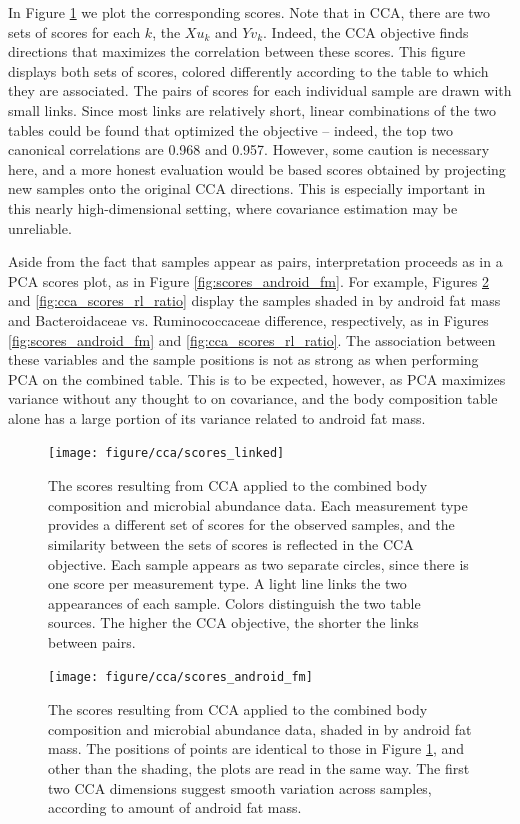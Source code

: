 \documentclass{article}
\begin{document}
In Figure \ref{fig:cca_scores_linked} we plot the corresponding scores. Note
that in CCA, there are two sets of scores for each $k$, the $Xu_{k}$ and
$Yv_{k}$. Indeed, the CCA objective finds directions that maximizes the
correlation between these scores. This figure displays both sets of scores,
colored differently according to the table to which they are associated. The
pairs of scores for each individual sample are drawn with small links. Since
most links are relatively short, linear combinations of the two tables could be
found that optimized the objective -- indeed, the top two canonical correlations
are 0.968 and 0.957. However, some caution is necessary here, and a more honest
evaluation would be based scores obtained by projecting new samples onto the
original CCA directions. This is especially important in this nearly
high-dimensional setting, where covariance estimation may be unreliable.

Aside from the fact that samples appear as pairs, interpretation proceeds as in
a PCA scores plot, as in Figure \ref{fig:scores_android_fm}. For example,
Figures \ref{fig:cca_scores_android_fm} and \ref{fig:cca_scores_rl_ratio}
display the samples shaded in by android fat mass and Bacteroidaceae vs.
Ruminococcaceae difference, respectively, as in Figures
\ref{fig:scores_android_fm} and \ref{fig:cca_scores_rl_ratio}. The association
between these variables and the sample positions is not as strong as when
performing PCA on the combined table. This is to be expected, however, as PCA
maximizes variance without any thought to on covariance, and the body
composition table alone has a large portion of its variance related to android
fat mass.

\begin{figure}
  \centering
  \texttt{[image: figure/cca/scores\_linked]}
  \caption{The scores resulting from CCA applied to the combined body
    composition and microbial abundance data. Each measurement type provides
    a different set of scores for the observed samples, and the similarity
    between the sets of scores is reflected in the CCA objective. Each sample
    appears as two separate circles, since there is one score per measurement
    type. A light line links the two appearances of each sample. Colors
    distinguish the two table sources. The higher the CCA objective, the shorter
    the links between pairs.
    \label{fig:cca_scores_linked}}
\end{figure}

\begin{figure}
  \centering
  \texttt{[image: figure/cca/scores\_android\_fm]}
  \caption{The scores resulting from CCA applied to the combined body
    composition and microbial abundance data, shaded in by android fat mass.
    The positions of points are identical to those in Figure
    \ref{fig:cca_scores_linked}, and other than the shading, the plots are read in
    the same way. The first two CCA dimensions suggest smooth variation across
    samples, according to amount of android fat
    mass. \label{fig:cca_scores_android_fm} }
\end{figure}
\end{document}
